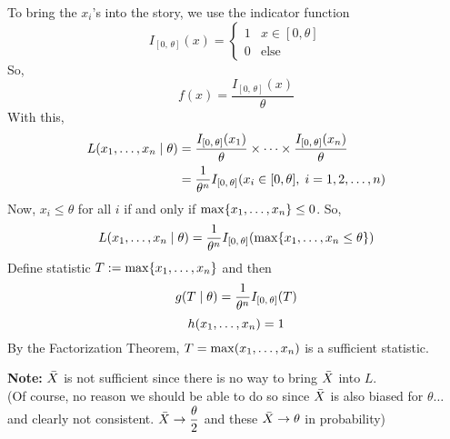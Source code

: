 \nl To bring the $x_i$'s into the story, we use the indicator function
$$I_{[0,\,\theta]}(x) = \begin{cases} 1 & x \in [0,\theta]\\ 0 & \text{else} \end{cases}$$
So, 
$$f(x) = \frac{I_{[0,\,\theta]}(x)}{\theta}$$
With this,
\begin{align}
    L(\thru{x} \mid \theta) &=  \frac{I_{[0,\,\theta]}(x_1)}{\theta} \times \cdots  \times \frac{I_{[0,\,\theta]}(x_n)}{\theta}\notag\\
    &= \over{\theta^n}I_{[0,\,\theta]}(x_i \in [0, \theta],\; i=1,2,\dots, n)\notag
\end{align}
Now, $x_i \leq \theta$ for all $i$ if and only if $\operatorname{max}\{{x}_1, \dots, {x}_n\} \leq 0$. So,
$$L(\thru{x} \mid \theta) = \over{\theta^n}I_{[0,\,\theta]}(\operatorname{max}\{\thru{x} \leq \theta\})$$
Define statistic $T := \operatorname{max}\{{x}_1, \dots, {x}_n\}$ and then
$$g(T \mid \theta) = \over{\theta^n}I_{[0,\,\theta]}(T)$$
$$h({x}_1, \dots, {x}_n) = 1$$
By the Factorization Theorem, $T = \operatorname{max}({x}_1, \dots, {x}_n)$ is a sufficient statistic.

\nl \textbf{Note:} $\bar{X}$ is not sufficient since there is no way to bring $\bar{X}$ into $L$.\\
(Of course, no reason we should be able to do so since $\bar{X}$ is also biased for $\theta\dots$ and clearly not consistent. $\bar{X} \to \dfrac{\theta}{2}$ and these $\bar{X} \to \theta$ in probability)